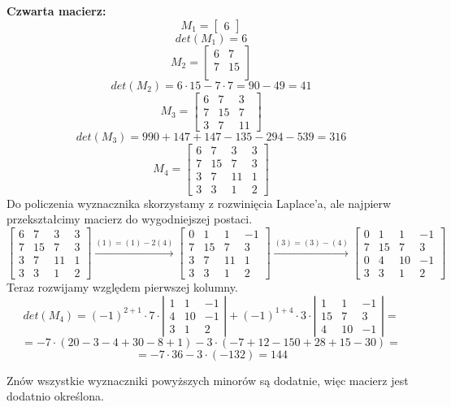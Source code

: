 \documentclass[12pt,a4paper]{article}
\begin{document}
\textbf{Czwarta macierz:}
\[
M_1=
\left[
\begin{array}{c}
6
\end{array}\right]
\]
\[
det(M_1)=6
\]
\[
M_2=
\left[
\begin{array}{cc}
6 & 7 \\
7 & 15 \\
\end{array}\right]
\]
\[
det(M_2) = 6 \cdot 15 - 7 \cdot 7 = 90 - 49 = 41 
\]
\[
M_3=
\left[
\begin{array}{ccc}
6 & 7 & 3\\
7 & 15 & 7\\
3 & 7 & 11
\end{array}\right]
\]
\[
det(M_3)= 990 + 147 + 147 - 135 - 294 - 539 = 316
\]
\newpage
\[
M_4=
\left[
\begin{array}{cccc}
6 & 7  & 3 & 3\\
7 & 15 & 7 & 3\\
3 & 7  & 11 & 1\\
3 & 3  & 1  & 2
\end{array}\right]
\]
Do policzenia wyznacznika skorzystamy z rozwinięcia Laplace'a, ale najpierw przekształcimy macierz do wygodniejszej postaci.
\[
\left[
\begin{array}{cccc}
6 & 7  & 3 & 3\\
7 & 15 & 7 & 3\\
3 & 7  & 11 & 1\\
3 & 3  & 1  & 2
\end{array}\right]
\xrightarrow{(1) = (1) - 2(4)}
\left[
\begin{array}{cccc}
0 & 1  & 1 & -1\\
7 & 15 & 7 & 3\\
3 & 7  & 11 & 1\\
3 & 3  & 1  & 2
\end{array}\right]
\xrightarrow{(3) = (3) - (4)}
\left[
\begin{array}{cccc}
0 & 1  & 1 & -1\\
7 & 15 & 7 & 3\\
0 & 4  & 10 & -1\\
3 & 3  & 1  & 2
\end{array}\right]
\]
Teraz rozwijamy względem pierwszej kolumny.
\[
det(M_4)= (-1)^{2+1} \cdot 7 \cdot
\left|
\begin{array}{ccc}
1 & 1 & -1\\
4 & 10 & -1\\
3 & 1 & 2
\end{array}\right|
+(-1)^{1+4}\cdot 3\cdot
\left|
\begin{array}{ccc}
1 & 1 & -1\\
15 & 7 & 3\\
4 & 10 & -1
\end{array}\right|
=
\]
\[
= -7\cdot (20 - 3 - 4 + 30 -8 +1) - 3 \cdot (-7 + 12 - 150 +28 + 15 - 30) =
\]
\[
= - 7 \cdot 36 - 3 \cdot (-132) = 144
\]

Znów wszystkie wyznaczniki powyższych minorów są dodatnie, więc macierz jest dodatnio określona.
\end{document}
